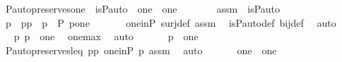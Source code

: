 \begin{isabellebody}
\isadelimproof
\isanewline
%
\endisadelimproof
\isanewline
{}\isamarkupfalse%
\ P{\isacharunderscore}{\kern0pt}auto{\isacharunderscore}{\kern0pt}preserves{\isacharunderscore}{\kern0pt}one\ {\isacharcolon}{\kern0pt}\ {\isachardoublequoteopen}is{\isacharunderscore}{\kern0pt}P{\isacharunderscore}{\kern0pt}auto{\isacharparenleft}{\kern0pt}{\isasympi}{\isacharparenright}{\kern0pt}\ {\isasymLongrightarrow}\ {\isasympi}{\isacharbackquote}{\kern0pt}one\ {\isacharequal}{\kern0pt}\ one{\isachardoublequoteclose}\ \isanewline
%
\isadelimproof
%
\endisadelimproof
%
\isatagproof
{}\isamarkupfalse%
\ {\isacharminus}{\kern0pt}\ \isanewline
\ \ \isamarkupfalse%
\ assm\ {\isacharcolon}{\kern0pt}\ {\isachardoublequoteopen}is{\isacharunderscore}{\kern0pt}P{\isacharunderscore}{\kern0pt}auto{\isacharparenleft}{\kern0pt}{\isasympi}{\isacharparenright}{\kern0pt}{\isachardoublequoteclose}\ \isanewline
\ \ \isamarkupfalse%
\ p\ \ pp\ {\isacharcolon}{\kern0pt}\ {\isachardoublequoteopen}p\ {\isasymin}\ P{\isachardoublequoteclose}\ {\isachardoublequoteopen}{\isasympi}{\isacharbackquote}{\kern0pt}p{\isacharequal}{\kern0pt}one{\isachardoublequoteclose}\ \isanewline
\ \ \ \ \isamarkupfalse%
\ one{\isacharunderscore}{\kern0pt}in{\isacharunderscore}{\kern0pt}P\ surj{\isacharunderscore}{\kern0pt}def\ assm\ \isamarkupfalse%
\ is{\isacharunderscore}{\kern0pt}P{\isacharunderscore}{\kern0pt}auto{\isacharunderscore}{\kern0pt}def\ bij{\isacharunderscore}{\kern0pt}def\ \isamarkupfalse%
\ auto\ \isanewline
\ \ \isamarkupfalse%
\ \isamarkupfalse%
\ p{}{\isacharcolon}{\kern0pt}\ {\isachardoublequoteopen}p\ {\isasympreceq}\ one{\isachardoublequoteclose}\ \isamarkupfalse%
\ one{\isacharunderscore}{\kern0pt}max\ \isamarkupfalse%
\ auto\ \isanewline
\ \ \isamarkupfalse%
\ \isamarkupfalse%
\ {\isachardoublequoteopen}{\isasympi}{\isacharbackquote}{\kern0pt}p\ {\isasympreceq}\ {\isasympi}{\isacharbackquote}{\kern0pt}one{\isachardoublequoteclose}\ \isanewline
\ \ \ \ \isamarkupfalse%
\ P{\isacharunderscore}{\kern0pt}auto{\isacharunderscore}{\kern0pt}preserves{\isacharunderscore}{\kern0pt}leq\ pp\ one{\isacharunderscore}{\kern0pt}in{\isacharunderscore}{\kern0pt}P\ p{}\ assm\ \isamarkupfalse%
\ auto\ \isanewline
\ \ \isamarkupfalse%
\ \isamarkupfalse%
\ {\isachardoublequoteopen}one\ {\isasympreceq}\ {\isasympi}{\isacharbackquote}{\kern0pt}one{\isachardoublequoteclose}\ \isamarkupfalse%

\end{isabellebody}
